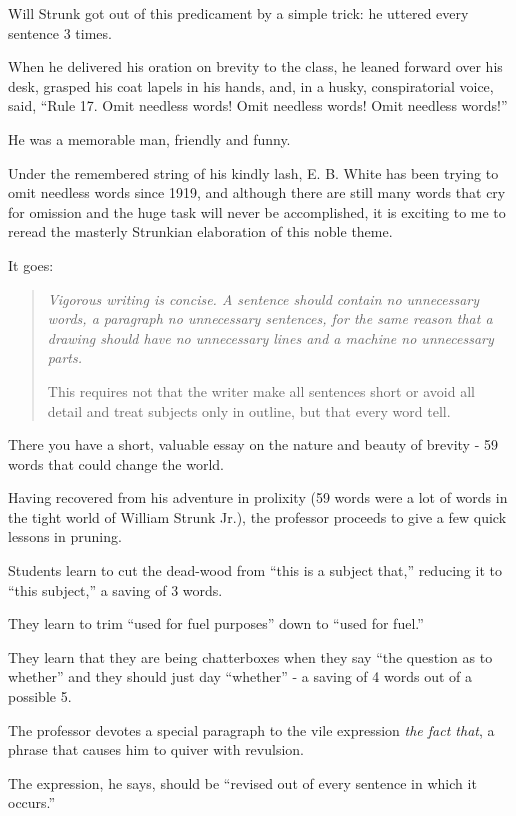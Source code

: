 \documentclass{article}
\begin{document}
Will Strunk got out of this predicament by a simple trick: he uttered every sentence 3 times.

When he delivered his oration on brevity to the class, he leaned forward over his desk, grasped his coat lapels in his hands, and, in a husky, conspiratorial voice, said, ``Rule 17. Omit needless words! Omit needless words! Omit needless words!''

%
He was a memorable man, friendly and funny.

Under the remembered string of his kindly lash, E. B. White has been trying to omit needless words since 1919, and although there are still many words that cry for omission and the huge task will never be accomplished, it is exciting to me to reread the masterly Strunkian elaboration of this noble theme.

It goes:

\begin{quotation}
	\it
	Vigorous writing is concise. A sentence should contain no unnecessary words, a paragraph no unnecessary sentences, for the same reason that a drawing should have no unnecessary lines and a machine no unnecessary parts.
	
	This requires not that the writer make all sentences short or avoid all detail and treat subjects only in outline, but that every word tell.
\end{quotation}
There you have a short, valuable essay on the nature and beauty of brevity - 59 words that could change the world.

Having recovered from his adventure in prolixity (59 words were a lot of words in the tight world of William Strunk Jr.), the professor proceeds to give a few quick lessons in pruning.

Students learn to cut the dead-wood from ``this is a subject that,'' reducing it to ``this subject,'' a saving of 3 words.

They learn to trim ``used for fuel purposes'' down to ``used for fuel.''

They learn that they are being chatterboxes when they say ``the question as to whether'' and they should just day ``whether'' - a saving of 4 words out of a possible 5.

%
The professor devotes a special paragraph to the vile expression {\it the fact that}, a phrase that causes him to quiver with revulsion.

The expression, he says, should be ``revised out of every sentence in which it occurs.''
\end{document}
